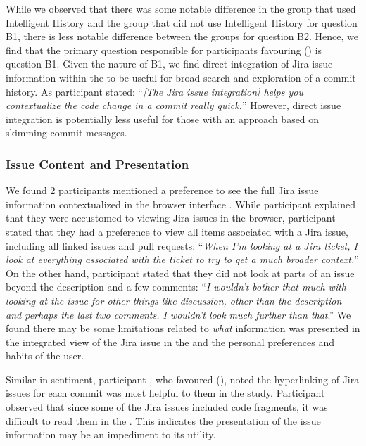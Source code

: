 While we observed that there was some notable difference in the group that used Intelligent History 
and the group that did not use Intelligent History for question B1,
there is less notable difference between the groups for question B2.
Hence, we find that the primary question responsible for participants favouring () is question B1.
Given the nature of B1, we find direct integration of Jira issue information within the  
to be useful for broad search and exploration of a commit history.
As participant  stated:
``\textit{[The Jira issue integration] helps you contextualize the code change in a commit really quick.}''
However, direct issue integration is potentially less useful for those with an approach based on skimming commit messages.

\subsubsection{Issue Content and Presentation}

We found 2 participants mentioned a preference to see the full Jira issue information contextualized in the browser interface .
While participant  explained that they were accustomed to viewing Jira issues in the browser,
participant  stated that they had a preference to view all items associated with a Jira issue, including all linked issues and pull requests:
``\textit{When I’m looking at a Jira ticket, I look at everything associated with the ticket to try to get a much broader context.}''
On the other hand,
participant  stated that they did not look at parts of an issue beyond the description and a few comments:
``\textit{I wouldn’t bother that much with looking at the issue for other things like discussion, other than the description and perhaps the last two comments. 
I wouldn’t look much further than that}.''
We found there may be some limitations related to \emph{what} information was presented in the integrated view of the Jira issue in the 
and the personal preferences and habits of the user.

Similar in sentiment, participant , who favoured (), noted the hyperlinking of Jira issues for each commit
was most helpful to them in the study.
Participant  observed that since some of the Jira issues 
included code fragments, it was difficult to read them in the .
This indicates the presentation of the issue information may be an impediment to its utility.

